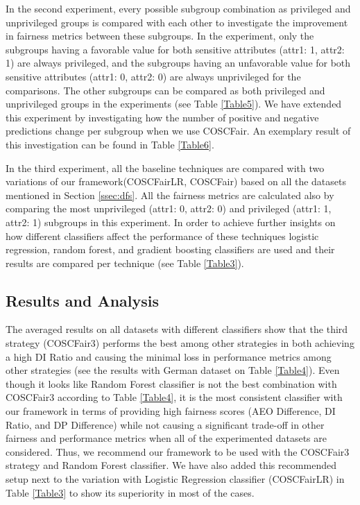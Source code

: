 




In the second experiment, every possible subgroup combination as privileged and unprivileged groups is compared with each other to investigate the improvement in fairness metrics between these subgroups. In the experiment, only the subgroups having a favorable value for both sensitive attributes (attr1: 1, attr2: 1) are always privileged, and the subgroups having an unfavorable value for both sensitive attributes (attr1: 0, attr2: 0) are always unprivileged for the comparisons. The other subgroups can be compared as both privileged and unprivileged groups in the experiments (see Table \ref{Table5}). We have extended this experiment by investigating how the number of positive and negative predictions change per subgroup when we use COSCFair. An exemplary result of this investigation can be found in Table \ref{Table6}.

In the third experiment, all the baseline techniques are compared with two variations of our framework(COSCFairLR, COSCFair) based on all the datasets mentioned in Section \ref{ssec:dfs}. All the fairness metrics are calculated also by comparing the most unprivileged (attr1: 0, attr2: 0) and privileged (attr1: 1, attr2: 1) subgroups in this experiment. In order to achieve further insights on how different classifiers affect the performance of these techniques logistic regression, random forest, and gradient boosting classifiers are used and their results are compared per technique (see Table \ref{Table3}).












\subsection{Results and Analysis}\label{ssec:results}

 The averaged results on all datasets with different classifiers show that the third strategy (COSCFair3) performs the best among other strategies in both achieving a high DI Ratio and causing the minimal loss in performance metrics among other strategies (see the results with German dataset on Table \ref{Table4}). 
Even though it looks like Random Forest classifier is not the best combination with COSCFair3 according to Table \ref{Table4}, it is the most consistent classifier with our framework in terms of providing high fairness scores (AEO Difference, DI Ratio, and DP Difference) while not causing a significant trade-off in other fairness and performance metrics when all of the experimented datasets are considered. 
Thus, we recommend our framework to be used with the COSCFair3 strategy and Random Forest classifier. We have also added this recommended setup next to the variation with Logistic Regression classifier (COSCFairLR) in Table \ref{Table3} to show its superiority in most of the cases.


